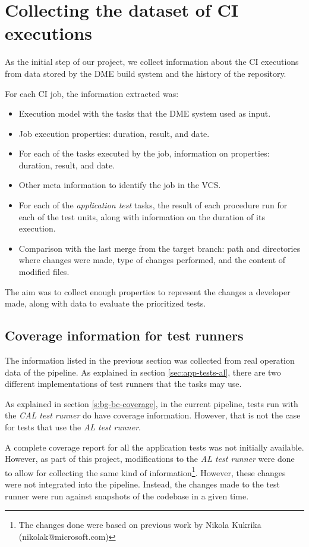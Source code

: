 \section{Collecting the dataset of CI executions}\label{s:method-collecting-dataset}

As the initial step of our project, we collect information about the CI executions
from data stored by the DME build system and the history of the repository.

For each CI job, the information extracted was:
\begin{itemize}
    \item Execution model with the tasks that the DME system used as input.
    \item Job execution properties: duration, result, and date.
    \item For each of the tasks executed by the job, information on properties: duration, result, and date.
    \item Other meta information to identify the job in the VCS.
    \item For each of the \emph{application test} tasks, the result of each procedure run for each of the test units, along with information on the duration of its execution.
    \item Comparison with the last merge from the target branch: path and directories where changes were made, type of changes performed, and the content of modified files.
\end{itemize}

The aim was to collect enough properties to represent the changes a developer made, 
along with data to evaluate the prioritized tests.

\subsection{Coverage information for test runners}\label{s:method-collecting-coverage}

The information listed in the previous section was collected from real operation data
of the pipeline. As explained in section \ref{sec:app-tests-al}, there are two different
implementations of test runners that the tasks may use.

As explained in section \ref{s:bg-bc-coverage}, in the current pipeline, tests run with the \emph{CAL test runner}
do have coverage information. However, that is not the case for tests that use the \emph{AL test runner}.

A complete coverage report for all the application tests was not initially available. However, as 
part of this project, modifications to the \emph{AL test runner} were done to allow 
for collecting the same kind of information\footnote{The changes done were based on 
previous work by Nikola Kukrika (nikolak@microsoft.com)}. However, these changes were not 
integrated into the pipeline. Instead, the changes made to the test runner were run against snapshots of 
the codebase in a given time.

